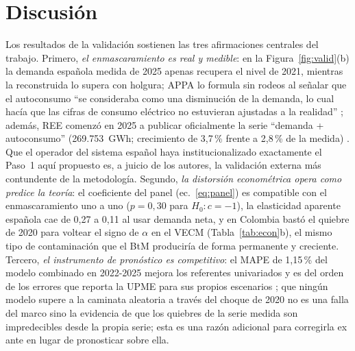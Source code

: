 \documentclass[11pt,letterpaper]{article}
\begin{document}
\section{Discusión}

Los resultados de la validación sostienen las tres afirmaciones centrales
del trabajo. Primero, \emph{el enmascaramiento es real y medible}: en la
Figura~\ref{fig:valid}(b) la demanda española medida de 2025 apenas recupera
el nivel de 2021, mientras la reconstruida lo supera con holgura; APPA lo
formula sin rodeos al señalar que el autoconsumo ``se consideraba como una
disminución de la demanda, lo cual hacía que las cifras de consumo eléctrico
no estuvieran ajustadas a la realidad'' \cite{appa2025}; además, REE comenzó
en 2025 a publicar oficialmente la serie ``demanda + autoconsumo''
(269.753~GWh; crecimiento de 3,7\,\% frente a 2,8\,\% de la medida)
\cite{reeise}. Que el operador del sistema español haya institucionalizado
exactamente el Paso~1 aquí propuesto es, a juicio de los autores, la
validación externa más contundente de la metodología. Segundo, \emph{la
distorsión econométrica opera como predice la teoría}: el coeficiente del
panel (ec.~\ref{eq:panel}) es compatible con el enmascaramiento uno a uno
($p=0{,}30$ para $H_0\!:c=-1$), la elasticidad aparente española cae de 0,27
a 0,11 al usar demanda neta, y en Colombia bastó el quiebre de 2020 para
voltear el signo de $\alpha$ en el VECM (Tabla~\ref{tab:econ}b), el mismo
tipo de contaminación que el BtM produciría de forma permanente y creciente.
Tercero, \emph{el instrumento de pronóstico es competitivo}: el MAPE de
1,15\,\% del modelo combinado en 2022-2025 mejora los referentes
univariados y es del orden de los errores que reporta la UPME para sus
propios escenarios \cite{upme2024}; que ningún modelo supere a la caminata
aleatoria a través del choque de 2020 no es una falla del marco sino la
evidencia de que los quiebres de la serie medida son impredecibles desde la
propia serie; esta es una razón adicional para corregirla ex ante en lugar
de pronosticar sobre ella.
\end{document}
